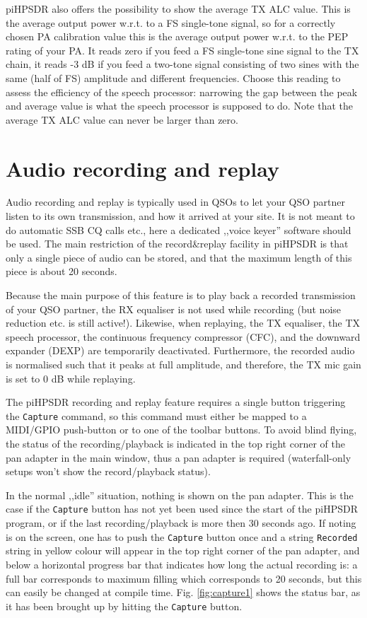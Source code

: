 \documentclass[12pt]{book}
\def\rett#1{\texttt{\color{red}#1}}
\def\bltt#1{\texttt{\color{blue}#1}}
\def\pH{pi\-HPSDR\xspace}
\begin{document}
\pH also offers the possibility to show the average TX ALC value. This is the average output power
w.r.t. to a FS single-tone signal, so for a correctly chosen PA calibration value this is the
average output power w.r.t. to the PEP rating of your PA. It reads zero if you feed a FS single-tone
sine signal to the TX chain, it reads -3 dB if you feed a two-tone signal consisting of two sines
with the same (half of FS) amplitude and different frequencies. Choose this reading to assess
the efficiency of the speech processor: narrowing the gap between the peak and average value is
what the speech processor is supposed to do. Note that the average TX ALC value can never be larger
than zero.
\clearpage
\section{Audio recording and replay}
\label{sec:capture}
Audio recording and replay is typically used in QSOs to let your QSO partner listen to its own transmission,
and how it arrived at your site. It is not meant to do automatic SSB CQ calls etc., here a dedicated
,,voice keyer'' software should be used. The main restriction of the record\&replay facility in \pH is
that only a single piece of audio can be stored, and that the maximum length of this piece is about 20 seconds.

Because the main purpose of this feature is to play back a recorded transmission of your QSO partner,
the RX equaliser is not used while recording (but noise reduction etc. is still active!). Likewise,
when replaying, the TX equaliser, the TX speech processor, the continuous frequency compressor (CFC),
and the downward expander (DEXP)
are temporarily deactivated. Furthermore, the recorded audio is normalised such that it peaks at full
amplitude, and therefore, the TX mic gain is set to 0 dB while replaying.

The \pH recording and replay feature requires a single button triggering the \bltt{Capture} command,
so this command must either be mapped to a MIDI/GPIO push-button or to one of the toolbar buttons.
To avoid blind flying, the status of the recording/playback is indicated in the top right corner of
the pan adapter in the main window, thus a pan adapter is required (waterfall-only setups won't show the
record/playback status).

In the normal ,,idle'' situation, nothing is shown on the pan adapter. This is the case if the \bltt{Capture}
button has not yet been used since the start of the \pH program, or if the last recording/playback is
more then 30 seconds ago. If noting is on the screen, one has to push the \bltt{Capture} button once and
a string \rett{Recorded} string in yellow colour will appear in the top right corner of the pan adapter,
and below a horizontal progress bar that indicates how long the actual recording is: a full bar corresponds
to maximum filling which corresponds to 20 seconds, but this can easily be changed at compile time.
Fig. \ref{fig:capture1} shows the status bar, as it has been brought up by hitting the \bltt{Capture} button.
\end{document}
